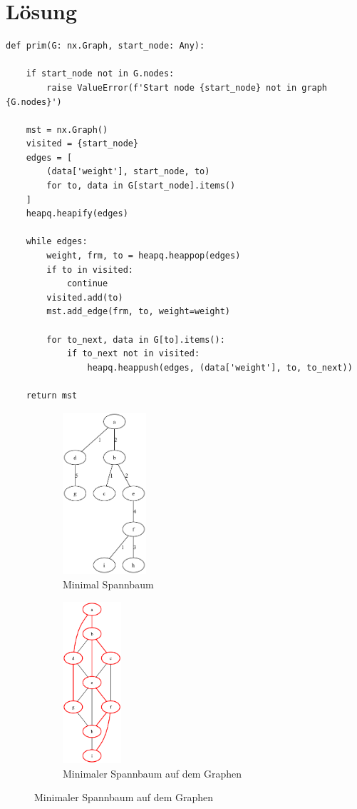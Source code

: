 \documentclass[a4paper,11pt]{report}
\begin{document}
    \section{Lösung}

    \begin{verbatim}
def prim(G: nx.Graph, start_node: Any):

    if start_node not in G.nodes:
        raise ValueError(f'Start node {start_node} not in graph {G.nodes}')

    mst = nx.Graph()
    visited = {start_node}
    edges = [
        (data['weight'], start_node, to)
        for to, data in G[start_node].items()
    ]
    heapq.heapify(edges)

    while edges:
        weight, frm, to = heapq.heappop(edges)
        if to in visited:
            continue
        visited.add(to)
        mst.add_edge(frm, to, weight=weight)

        for to_next, data in G[to].items():
            if to_next not in visited:
                heapq.heappush(edges, (data['weight'], to, to_next))

    return mst
    \end{verbatim}

    \begin{figure}[htbp]
        \centering
        \begin{subfigure}[b]{0.3\textwidth}
            \includegraphics[height=6cm]{a01a_mst}
            \caption{Minimal Spannbaum}
            \label{fig:a01_mst}
        \end{subfigure}
        \begin{subfigure}[b]{0.3\textwidth}
            \includegraphics[height=6cm]{a01a_graph_highlighted}
            \caption{Minimaler Spannbaum auf dem Graphen}
            \label{fig:a01_graph_highlighted}
        \end{subfigure}
    \end{figure}
\end{document}

